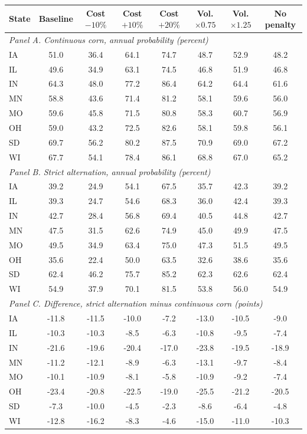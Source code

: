 \begin{tabular}{lccccccc}
\toprule
State & Baseline & Cost $-10\%$ & Cost $+10\%$ & Cost $+20\%$ & Vol. $\times 0.75$ & Vol. $\times 1.25$ & No penalty\\
\midrule
\multicolumn{8}{l}{\emph{Panel A. Continuous corn, annual probability (percent)}}\\
IA & 51.0 & 36.4 & 64.1 & 74.7 & 48.7 & 52.9 & 48.2 \\
IL & 49.6 & 34.9 & 63.1 & 74.5 & 46.8 & 51.9 & 46.8 \\
IN & 64.3 & 48.0 & 77.2 & 86.4 & 64.2 & 64.4 & 61.6 \\
MN & 58.8 & 43.6 & 71.4 & 81.2 & 58.1 & 59.6 & 56.0 \\
MO & 59.6 & 45.8 & 71.5 & 80.8 & 58.3 & 60.7 & 56.9 \\
OH & 59.0 & 43.2 & 72.5 & 82.6 & 58.1 & 59.8 & 56.1 \\
SD & 69.7 & 56.2 & 80.2 & 87.5 & 70.9 & 69.0 & 67.2 \\
WI & 67.7 & 54.1 & 78.4 & 86.1 & 68.8 & 67.0 & 65.2 \\
\midrule
\multicolumn{8}{l}{\emph{Panel B. Strict alternation, annual probability (percent)}}\\
IA & 39.2 & 24.9 & 54.1 & 67.5 & 35.7 & 42.3 & 39.2 \\
IL & 39.3 & 24.7 & 54.6 & 68.3 & 36.0 & 42.4 & 39.3 \\
IN & 42.7 & 28.4 & 56.8 & 69.4 & 40.5 & 44.8 & 42.7 \\
MN & 47.5 & 31.5 & 62.6 & 74.9 & 45.0 & 49.9 & 47.5 \\
MO & 49.5 & 34.9 & 63.4 & 75.0 & 47.3 & 51.5 & 49.5 \\
OH & 35.6 & 22.4 & 50.0 & 63.5 & 32.6 & 38.6 & 35.6 \\
SD & 62.4 & 46.2 & 75.7 & 85.2 & 62.3 & 62.6 & 62.4 \\
WI & 54.9 & 37.9 & 70.1 & 81.5 & 53.8 & 56.0 & 54.9 \\
\midrule
\multicolumn{8}{l}{\emph{Panel C. Difference, strict alternation minus continuous corn (points)}}\\
IA & -11.8 & -11.5 & -10.0 & -7.2 & -13.0 & -10.5 & -9.0 \\
IL & -10.3 & -10.3 & -8.5 & -6.3 & -10.8 & -9.5 & -7.4 \\
IN & -21.6 & -19.6 & -20.4 & -17.0 & -23.8 & -19.5 & -18.9 \\
MN & -11.2 & -12.1 & -8.9 & -6.3 & -13.1 & -9.7 & -8.4 \\
MO & -10.1 & -10.9 & -8.1 & -5.8 & -10.9 & -9.2 & -7.4 \\
OH & -23.4 & -20.8 & -22.5 & -19.0 & -25.5 & -21.2 & -20.5 \\
SD & -7.3 & -10.0 & -4.5 & -2.3 & -8.6 & -6.4 & -4.8 \\
WI & -12.8 & -16.2 & -8.3 & -4.6 & -15.0 & -11.0 & -10.3 \\
\bottomrule
\end{tabular}
